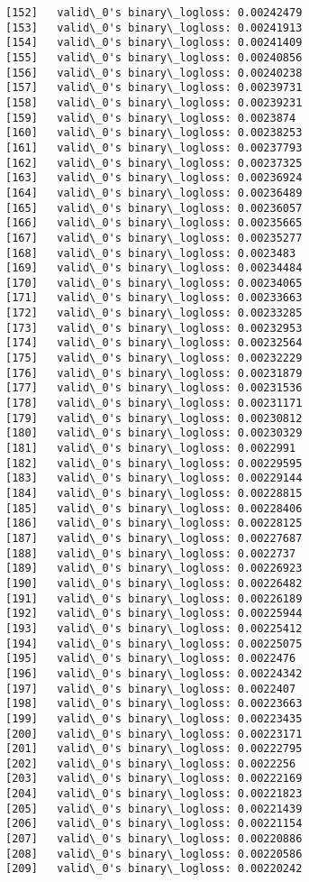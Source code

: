 \documentclass[11pt]{article}
\begin{document}
\begin{Verbatim}[commandchars=\\\{\}]
[152]	valid\_0's binary\_logloss: 0.00242479
[153]	valid\_0's binary\_logloss: 0.00241913
[154]	valid\_0's binary\_logloss: 0.00241409
[155]	valid\_0's binary\_logloss: 0.00240856
[156]	valid\_0's binary\_logloss: 0.00240238
[157]	valid\_0's binary\_logloss: 0.00239731
[158]	valid\_0's binary\_logloss: 0.00239231
[159]	valid\_0's binary\_logloss: 0.0023874
[160]	valid\_0's binary\_logloss: 0.00238253
[161]	valid\_0's binary\_logloss: 0.00237793
[162]	valid\_0's binary\_logloss: 0.00237325
[163]	valid\_0's binary\_logloss: 0.00236924
[164]	valid\_0's binary\_logloss: 0.00236489
[165]	valid\_0's binary\_logloss: 0.00236057
[166]	valid\_0's binary\_logloss: 0.00235665
[167]	valid\_0's binary\_logloss: 0.00235277
[168]	valid\_0's binary\_logloss: 0.0023483
[169]	valid\_0's binary\_logloss: 0.00234484
[170]	valid\_0's binary\_logloss: 0.00234065
[171]	valid\_0's binary\_logloss: 0.00233663
[172]	valid\_0's binary\_logloss: 0.00233285
[173]	valid\_0's binary\_logloss: 0.00232953
[174]	valid\_0's binary\_logloss: 0.00232564
[175]	valid\_0's binary\_logloss: 0.00232229
[176]	valid\_0's binary\_logloss: 0.00231879
[177]	valid\_0's binary\_logloss: 0.00231536
[178]	valid\_0's binary\_logloss: 0.00231171
[179]	valid\_0's binary\_logloss: 0.00230812
[180]	valid\_0's binary\_logloss: 0.00230329
[181]	valid\_0's binary\_logloss: 0.0022991
[182]	valid\_0's binary\_logloss: 0.00229595
[183]	valid\_0's binary\_logloss: 0.00229144
[184]	valid\_0's binary\_logloss: 0.00228815
[185]	valid\_0's binary\_logloss: 0.00228406
[186]	valid\_0's binary\_logloss: 0.00228125
[187]	valid\_0's binary\_logloss: 0.00227687
[188]	valid\_0's binary\_logloss: 0.0022737
[189]	valid\_0's binary\_logloss: 0.00226923
[190]	valid\_0's binary\_logloss: 0.00226482
[191]	valid\_0's binary\_logloss: 0.00226189
[192]	valid\_0's binary\_logloss: 0.00225944
[193]	valid\_0's binary\_logloss: 0.00225412
[194]	valid\_0's binary\_logloss: 0.00225075
[195]	valid\_0's binary\_logloss: 0.0022476
[196]	valid\_0's binary\_logloss: 0.00224342
[197]	valid\_0's binary\_logloss: 0.0022407
[198]	valid\_0's binary\_logloss: 0.00223663
[199]	valid\_0's binary\_logloss: 0.00223435
[200]	valid\_0's binary\_logloss: 0.00223171
[201]	valid\_0's binary\_logloss: 0.00222795
[202]	valid\_0's binary\_logloss: 0.0022256
[203]	valid\_0's binary\_logloss: 0.00222169
[204]	valid\_0's binary\_logloss: 0.00221823
[205]	valid\_0's binary\_logloss: 0.00221439
[206]	valid\_0's binary\_logloss: 0.00221154
[207]	valid\_0's binary\_logloss: 0.00220886
[208]	valid\_0's binary\_logloss: 0.00220586
[209]	valid\_0's binary\_logloss: 0.00220242

\end{Verbatim}
\end{document}

